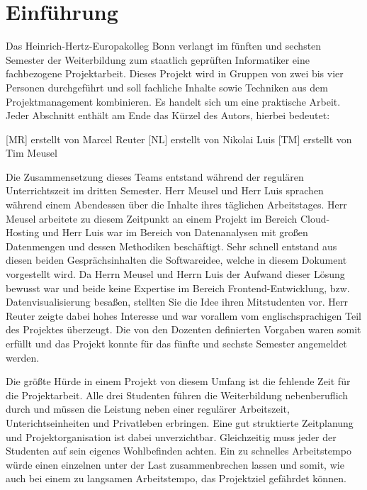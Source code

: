 \section{Einführung}
\label{sec:einfuehrung}
Das Heinrich-Hertz-Europakolleg Bonn verlangt im fünften und sechsten Semester
der Weiterbildung zum staatlich geprüften Informatiker eine fachbezogene
Projektarbeit. Dieses Projekt wird in Gruppen von zwei bis vier Personen
durchgeführt und soll fachliche Inhalte sowie Techniken aus dem
Projektmanagement kombinieren. Es handelt sich um eine praktische Arbeit. Jeder
Abschnitt enthält am Ende das Kürzel des Autors, hierbei bedeutet:

\begin{outline}
  \1 {[MR]} erstellt von Marcel Reuter
  \1 {[NL]} erstellt von Nikolai Luis
  \1 {[TM]} erstellt von Tim Meusel
\end{outline}

Die Zusammensetzung dieses Teams entstand während der regulären Unterrichtszeit
im dritten Semester. Herr Meusel und Herr Luis sprachen während einem
Abendessen über die Inhalte ihres täglichen Arbeitstages. Herr Meusel arbeitete
zu diesem Zeitpunkt an einem Projekt im Bereich Cloud-Hosting und Herr Luis war
im Bereich von Datenanalysen mit großen Datenmengen und dessen Methodiken
beschäftigt. Sehr schnell entstand aus diesen beiden Gesprächsinhalten die
Softwareidee, welche in diesem Dokument vorgestellt wird. Da Herrn Meusel und
Herrn Luis der Aufwand dieser Lösung bewusst war und beide keine Expertise im
Bereich Frontend-Entwicklung, bzw. Datenvisualisierung besaßen, stellten Sie
die Idee ihren Mitstudenten vor. Herr Reuter zeigte dabei hohes Interesse und
war vorallem vom englischsprachigen Teil des Projektes überzeugt. Die von den
Dozenten definierten Vorgaben waren somit erfüllt und das Projekt konnte für
das fünfte und sechste Semester angemeldet werden.

Die größte Hürde in einem Projekt von diesem Umfang ist die fehlende Zeit für
die Projektarbeit. Alle drei Studenten führen die Weiterbildung nebenberuflich
durch und müssen die Leistung neben einer regulärer Arbeitszeit,
Unterichtseinheiten und Privatleben erbringen. Eine gut struktierte
Zeitplanung und Projektorganisation ist dabei unverzichtbar. Gleichzeitig
muss jeder der Studenten auf sein eigenes Wohlbefinden achten. Ein zu
schnelles Arbeitstempo würde einen einzelnen unter der Last zusammenbrechen
lassen und somit, wie auch bei einem zu langsamen Arbeitstempo, das Projektziel
gefährdet können.

